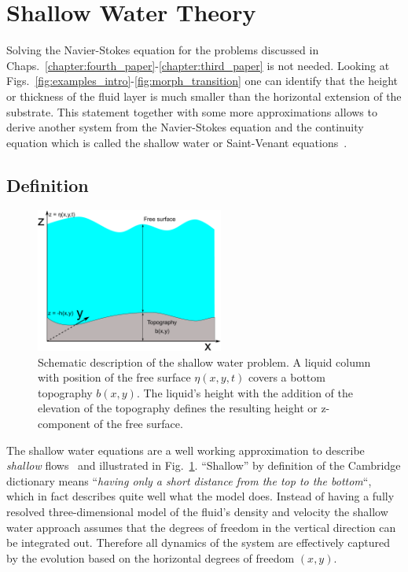\section{Shallow Water Theory}
\label{sec:theory_shallow_water}
Solving the Navier-Stokes equation for the problems discussed in Chaps.~\ref{chapter:fourth_paper}-\ref{chapter:third_paper} is not needed.
Looking at Figs.~\ref{fig:examples_intro}-\ref{fig:morph_transition} one can identify that the height or thickness of the fluid layer is much smaller than the horizontal extension of the substrate.
This statement together with some more approximations allows to derive another system from the Navier-Stokes equation and the continuity equation which is called the shallow water or Saint-Venant equations~\cite{bTheorieMouvementNonpermanent1871}.

\subsection{Definition}
\begin{figure}
    \centering
    \includegraphics[width=0.55\textwidth]{graphics/simple_shallow_water.pdf}
    \caption{Schematic description of the shallow water problem. A liquid column with position of the free surface $\eta(x,y,t)$ covers a bottom topography $b(x,y)$.
    The liquid's height with the addition of the elevation of the topography defines the resulting height or z-component of the free surface.}
    \label{fig:shallow_water_drawing}
\end{figure}

The shallow water equations are a well working approximation to describe \textit{shallow} flows~\cite{tanShallowWaterHydrodynamics1992} and illustrated in Fig.~\ref{fig:shallow_water_drawing}.
``Shallow'' by definition of the Cambridge dictionary means ``\textit{having only a short distance from the top to the bottom}``, which in fact describes quite well what the model does.
Instead of having a fully resolved three-dimensional model of the fluid's density and velocity the shallow water approach assumes that the degrees of freedom in the vertical direction can be integrated out. 
Therefore all dynamics of the system are effectively captured by the evolution based on the horizontal degrees of freedom $(x,y)$.

